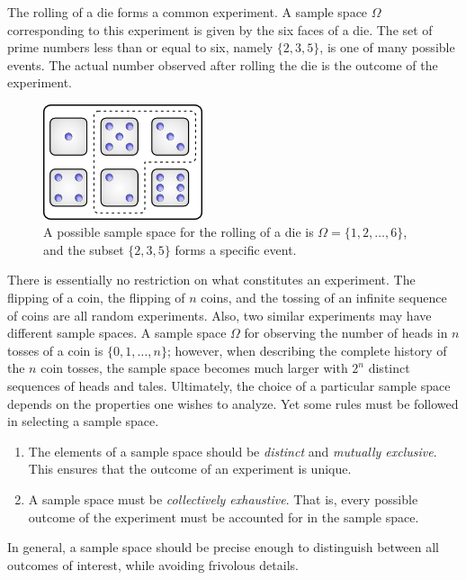 \begin{example}
The rolling of a die forms a common experiment.
A sample space $\Omega$ corresponding to this experiment is given by the six faces of a die.
The set of prime numbers less than or equal to six, namely $\{ 2, 3, 5 \}$, is one of many possible events.
The actual number observed after rolling the die is the outcome of the experiment.

\begin{figure}[htb!]
\begin{center}
\includegraphics[height=3.38cm]{Figures/2Chapter/dices}
\caption{A possible sample space for the rolling of a die is $\Omega = \{ 1, 2, \ldots, 6 \}$, and the subset $\{2, 3, 5 \}$ forms a specific event.}
\end{center}
\end{figure}
\end{example}

There is essentially no restriction on what constitutes an experiment.
The flipping of a coin, the flipping of $n$ coins, and the tossing of an infinite sequence of coins are all random experiments.
Also, two similar experiments may have different sample spaces.
A sample space $\Omega$ for observing the number of heads in $n$ tosses of a coin is $\{ 0, 1, \ldots, n \}$; however, when describing the complete history of the $n$ coin tosses, the sample space becomes much larger with $2^n$ distinct sequences of heads and tales.
Ultimately, the choice of a particular sample space depends on the properties one wishes to analyze.
Yet some rules must be followed in selecting a sample space.
\begin{enumerate}
\item The elements of a sample space should be \emph{distinct} and \emph{mutually exclusive}.
This ensures that the outcome of an experiment is unique.
\item A sample space must be \emph{collectively exhaustive}.
That is, every possible outcome of the experiment must be accounted for in the sample space.
\end{enumerate}
In general, a sample space should be precise enough to distinguish between all outcomes of interest, while avoiding frivolous details.

